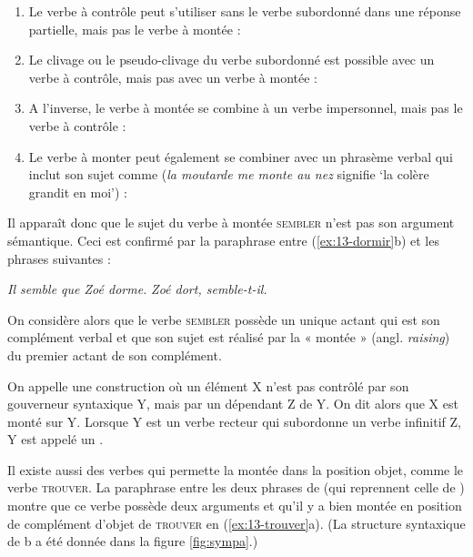 \begin{enumerate}[label=(\arabic*)]
\item	Le verbe à contrôle peut s’utiliser sans le verbe subordonné dans une réponse partielle, mais pas le verbe à montée :
\ea{}
\z\z

\item	Le clivage ou le pseudo-clivage du verbe subordonné est possible avec un verbe à contrôle, mais pas avec un verbe à montée :
\ea{}
\z\z

\item	A l’inverse, le verbe à montée se combine à un verbe impersonnel, mais pas le verbe à contrôle :
\ea{}
\z\z

\item	Le verbe à monter peut également se combiner avec un phrasème verbal qui inclut son sujet comme  (\textit{la moutarde me monte au nez} signifie ‘la colère grandit en moi’) :
\ea{}
\z\z

\end{enumerate}

Il apparaît donc que le sujet du verbe à montée \textsc{sembler} n’est pas son argument sémantique. Ceci est confirmé par la paraphrase entre (\ref{ex:13-dormir}b) et les phrases suivantes :

\ea\ea \textit{Il semble que Zoé dorme.}
\ex \textit{Zoé dort, semble-t-il.}\z\z

On considère alors que le verbe \textsc{sembler} possède un unique actant qui est son complément verbal et que son sujet est réalisé par la « montée » (angl. \textit{raising}) du premier actant de son complément. 

{On appelle  une construction où un élément X n’est pas contrôlé par son gouverneur syntaxique Y, mais par un dépendant Z de Y. On dit alors que X est monté sur Y. Lorsque Y est un verbe recteur qui subordonne un verbe infinitif Z, Y est appelé un .}

Il existe aussi des verbes qui permette la montée dans la position objet, comme le verbe \textsc{trouver}. La paraphrase entre les deux phrases de  (qui reprennent celle de ) montre que ce verbe possède deux arguments et qu’il y a bien montée en position de complément d’objet de \textsc{trouver} en (\ref{ex:13-trouver}a). (La structure syntaxique de b a été donnée dans la figure \ref{fig:sympa}.)

